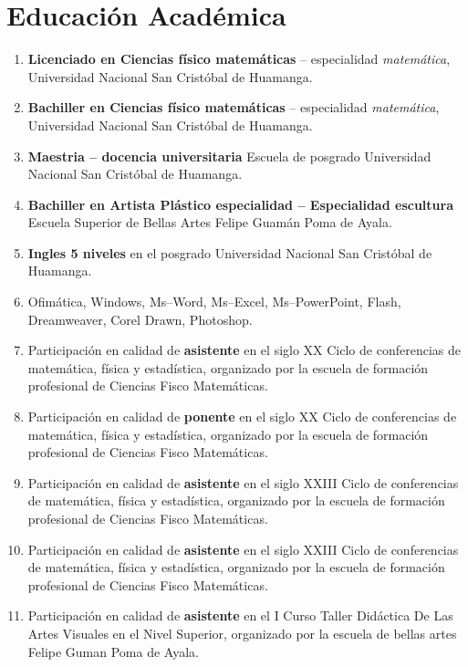 \documentclass[]{krantz}
\begin{document}
\hypertarget{educaciuxf3n-acaduxe9mica}{%
\section*{Educación Académica}\label{educaciuxf3n-acaduxe9mica}}

\begin{enumerate}
\def\labelenumi{\arabic{enumi}.}
\item
  \textbf{Licenciado en Ciencias físico matemáticas} -- especialidad \emph{matemática}, Universidad Nacional San Cristóbal de Huamanga.
\item
  \textbf{Bachiller en Ciencias físico matemáticas} -- especialidad \emph{matemática}, Universidad Nacional San Cristóbal de Huamanga.
\item
  \textbf{Maestria -- docencia universitaria} Escuela de posgrado Universidad Nacional San Cristóbal de Huamanga.
\item
  \textbf{Bachiller en Artista Plástico especialidad -- Especialidad escultura} Escuela Superior de Bellas Artes Felipe Guamán Poma de Ayala.
\item
  \textbf{Ingles 5 niveles} en el posgrado Universidad Nacional San Cristóbal de Huamanga.
\item
  Ofimática, Windows, Ms--Word, Ms--Excel, Ms--PowerPoint, Flash, Dreamweaver, Corel Drawn, Photoshop.
\item
  Participación en calidad de \textbf{asistente} en el siglo XX Ciclo de conferencias de matemática, física y estadística, organizado por la escuela de formación profesional de Ciencias Fisco Matemáticas.
\item
  Participación en calidad de \textbf{ponente} en el siglo XX Ciclo de conferencias de matemática, física y estadística, organizado por la escuela de formación profesional de Ciencias Fisco Matemáticas.
\item
  Participación en calidad de \textbf{asistente} en el siglo XXIII Ciclo de conferencias de matemática, física y estadística, organizado por la escuela de formación profesional de Ciencias Fisco Matemáticas.
\item
  Participación en calidad de \textbf{asistente} en el siglo XXIII Ciclo de conferencias de matemática, física y estadística, organizado por la escuela de formación profesional de Ciencias Fisco Matemáticas.
\item
  Participación en calidad de \textbf{asistente} en el I Curso Taller Didáctica De Las Artes Visuales en el Nivel Superior, organizado por la escuela de bellas artes Felipe Guman Poma de Ayala.
\end{enumerate}
\end{document}
